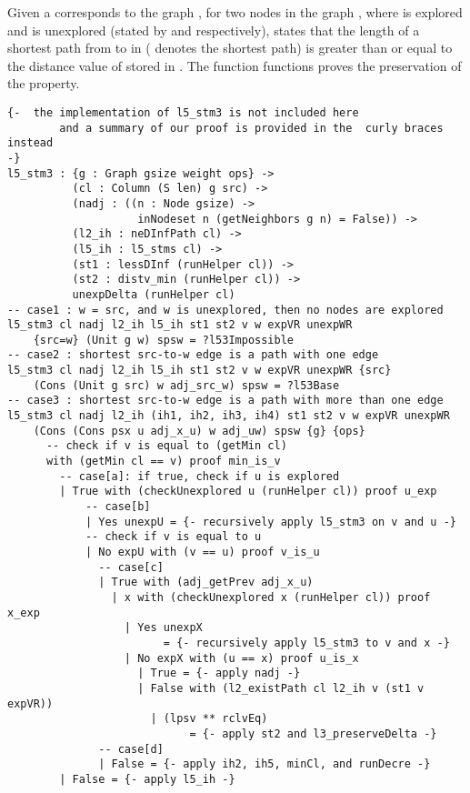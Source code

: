 Given a   corresponds to the graph , for two nodes  in the graph , where  is explored and  is unexplored (stated by  and  respectively),  states that the length of a shortest path from  to  in ( denotes the shortest path) is greater than or equal to the distance value of  stored in . The function  functions proves the preservation of the  property. 
\begin{lstlisting}
{-  the implementation of l5_stm3 is not included here 
		and a summary of our proof is provided in the  curly braces instead
-}
l5_stm3 : {g : Graph gsize weight ops} ->
          (cl : Column (S len) g src) ->
          (nadj : ((n : Node gsize) -> 
          			inNodeset n (getNeighbors g n) = False)) ->
          (l2_ih : neDInfPath cl) ->
          (l5_ih : l5_stms cl) ->
          (st1 : lessDInf (runHelper cl)) ->
          (st2 : distv_min (runHelper cl)) ->
          unexpDelta (runHelper cl)
-- case1 : w = src, and w is unexplored, then no nodes are explored
l5_stm3 cl nadj l2_ih l5_ih st1 st2 v w expVR unexpWR 
	{src=w} (Unit g w) spsw = ?l53Impossible
-- case2 : shortest src-to-w edge is a path with one edge
l5_stm3 cl nadj l2_ih l5_ih st1 st2 v w expVR unexpWR {src} 
	(Cons (Unit g src) w adj_src_w) spsw = ?l53Base
-- case3 : shortest src-to-w edge is a path with more than one edge
l5_stm3 cl nadj l2_ih (ih1, ih2, ih3, ih4) st1 st2 v w expVR unexpWR 
	(Cons (Cons psx u adj_x_u) w adj_uw) spsw {g} {ops}
	  -- check if v is equal to (getMin cl)
	  with (getMin cl == v) proof min_is_v
	  	-- case[a]: if true, check if u is explored 
	    | True with (checkUnexplored u (runHelper cl)) proof u_exp
	    	-- case[b]
	        | Yes unexpU = {- recursively apply l5_stm3 on v and u -}
	        -- check if v is equal to u
	        | No expU with (v == u) proof v_is_u 
	          -- case[c]
	          | True with (adj_getPrev adj_x_u)
	            | x with (checkUnexplored x (runHelper cl)) proof x_exp
	              | Yes unexpX 
	              		= {- recursively apply l5_stm3 to v and x -}
	              | No expX with (u == x) proof u_is_x
	                | True = {- apply nadj -}
	                | False with (l2_existPath cl l2_ih v (st1 v expVR))
	                  | (lpsv ** rclvEq) 
	                  		= {- apply st2 and l3_preserveDelta -}
	          -- case[d]
	          | False = {- apply ih2, ih5, minCl, and runDecre -}
	    | False = {- apply l5_ih -}
\end{lstlisting}

